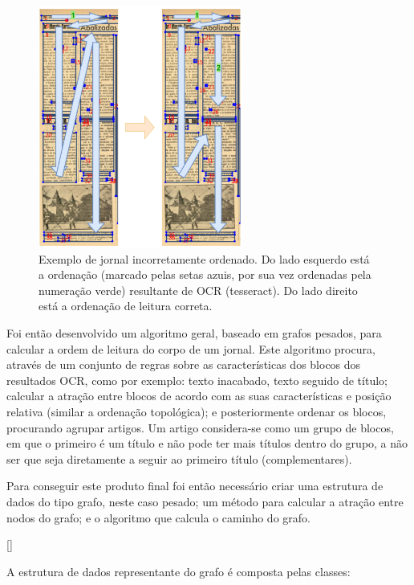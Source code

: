 \begin{figure}[H]
	\centering
	\includegraphics[width=0.6\textwidth]{images/ilustracoes/journal_wrong_order_example.png}
	\caption{Exemplo de jornal incorretamente ordenado. Do lado esquerdo está a ordenação (marcado pelas setas azuis, por sua vez ordenadas pela numeração verde) resultante de OCR (tesseract). Do lado direito está a ordenação de leitura correta.}
	\label{fig:journal_wrong_order_example}
\end{figure}


Foi então desenvolvido um algoritmo geral, baseado em grafos pesados, para calcular a ordem de leitura do corpo de um jornal. Este algoritmo procura, através de um conjunto de regras sobre as características dos blocos dos resultados OCR, como por exemplo: texto inacabado, texto seguido de título; calcular a atração entre blocos de acordo com as suas características e posição relativa (similar a ordenação topológica); e posteriormente ordenar os blocos, procurando agrupar artigos. Um artigo considera-se como um grupo de blocos, em que o primeiro é um título e não pode ter mais títulos dentro do grupo, a não ser que seja diretamente a seguir ao primeiro título (complementares).

Para conseguir este produto final foi então necessário criar uma estrutura de dados do tipo grafo, neste caso pesado; um método para calcular a atração entre nodos do grafo; e o algoritmo que calcula o caminho do grafo.

[\normalsize]

A estrutura de dados representante do grafo é composta pelas classes:

